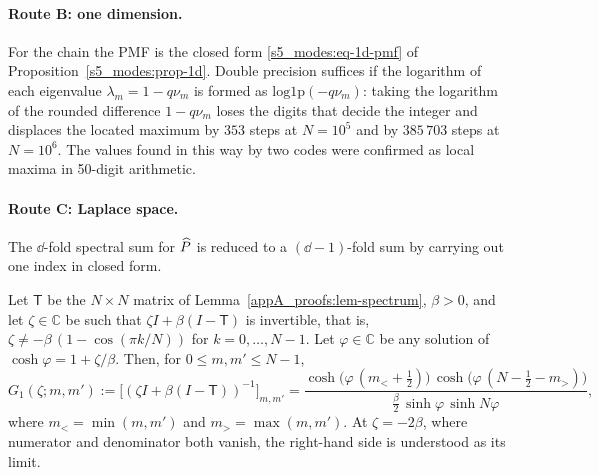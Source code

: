 \paragraph{Route B: one dimension.} For the chain the PMF is the closed form \eqref{s5_modes:eq-1d-pmf} of
Proposition~\ref{s5_modes:prop-1d}. Double precision suffices if the logarithm of each eigenvalue
$\lambda_m=1-q\nu_m$ is formed as $\mathrm{log1p}(-q\nu_m)$: taking the logarithm of the rounded difference
$1-q\nu_m$ loses the digits that decide the integer and displaces the located maximum by $353$ steps at $N=10^{5}$ and
by $385\,703$ steps at $N=10^{6}$. The values found in this way by two codes were confirmed as local maxima in
50-digit arithmetic.

\paragraph{Route C: Laplace space.} The $\dd$-fold spectral sum for $\widehat{P}$ is reduced to a $(\dd-1)$-fold sum by
carrying out one index in closed form.

\begin{lemma}\label{s3_methods:lem-resolvent}
Let $\mathsf T$ be the $N\times N$ matrix of Lemma~\ref{appA_proofs:lem-spectrum}, $\beta>0$, and let $\zeta\in\mathbb C$ be
such that $\zeta I+\beta(I-\mathsf T)$ is invertible, that is, $\zeta\neq-\beta\,(1-\cos(\pi k/N))$ for $k=0,\dots,N-1$.
Let $\varphi\in\mathbb C$ be any solution of $\cosh\varphi=1+\zeta/\beta$. Then, for $0\le m,m'\le N-1$,
\begin{equation}\label{s3_methods:eq-resolvent}
  G_1(\zeta;m,m'):=\bigl[(\zeta I+\beta(I-\mathsf T))^{-1}\bigr]_{m,m'}
  =\frac{\cosh\bigl(\varphi\,(m_<+\tfrac12)\bigr)\,\cosh\bigl(\varphi\,(N-\tfrac12-m_>)\bigr)}
        {\tfrac{\beta}{2}\,\sinh\varphi\,\sinh N\varphi},
\end{equation}
where $m_<=\min(m,m')$ and $m_>=\max(m,m')$. At $\zeta=-2\beta$, where numerator and denominator both vanish, the
right-hand side is understood as its limit.
\end{lemma}

